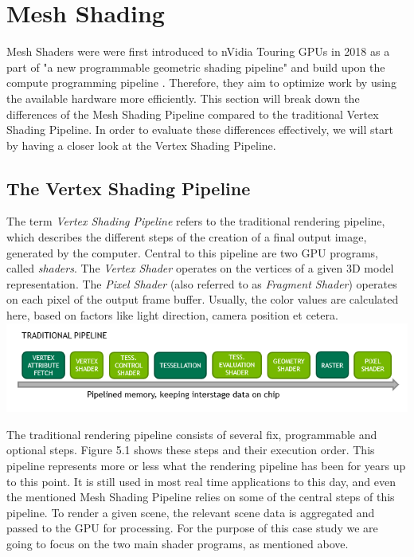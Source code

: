 \chapter{Mesh Shading}


Mesh Shaders were were first introduced to nVidia Touring \ac{GPU}s in 2018 as a part of
"a new programmable geometric shading pipeline" and build upon the compute programming 
pipeline \cite[Christoph Kubisch]{Kubisch2018}. Therefore, they aim to optimize work by 
using the available hardware more efficiently. This section will break down the differences 
of the Mesh Shading Pipeline compared to the traditional Vertex Shading Pipeline. In order 
to evaluate these differences effectively, we will start by having a closer look at the 
Vertex Shading Pipeline.

\section{The Vertex Shading Pipeline}

The term \emph{Vertex Shading Pipeline} refers to the traditional rendering pipeline, which 
describes the different steps of the creation of a final output image, generated by the 
computer. Central to this pipeline are two \ac{GPU} programs, called \emph{shaders}. The 
\emph{Vertex Shader} operates on the vertices of a given 3D model representation. 
The \emph{Pixel Shader} (also referred to as \emph{Fragment Shader}) operates on each pixel 
of the output frame buffer. Usually, the color values are calculated here, based on factors 
like light direction, camera position et cetera. \\

\includegraphics[width=\linewidth]{images/graphics/traditional-rendering-pipeline.png} %

\noindent
The traditional rendering pipeline consists of several fix, programmable and optional steps.
Figure 5.1 shows these steps and their execution order. This pipeline represents more or less   %
what the rendering pipeline has been for years up to this point. It is still used in most 
real time applications to this day, and even the mentioned Mesh Shading Pipeline relies on some of 
the central steps of this pipeline. To render a given scene, the relevant scene data is aggregated 
and passed to the \ac{GPU} for processing. For the purpose of this case study we are going to focus 
on the two main shader programs, as mentioned above. \\

